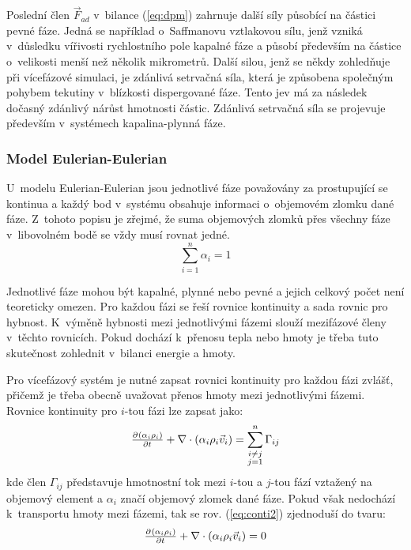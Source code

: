 Poslední člen $\vec{F}_{ad}$ v~bilance (\ref{eq:dpm}) zahrnuje další síly působící na částici pevné fáze. Jedná se například o~Saffmanovu vztlakovou sílu, jenž vzniká v~důsledku vířivosti rychlostního pole kapalné fáze a působí především na částice o~velikosti menší než několik mikrometrů. Další silou, jenž se někdy zohledňuje při vícefázové simulaci, je zdánlivá setrvačná síla, která je způsobena společným pohybem tekutiny v~blízkosti dispergované fáze. Tento jev má za následek dočasný zdánlivý nárůst hmotnosti částic. Zdánlivá setrvačná síla se projevuje především v~systémech kapalina-plynná fáze.  

\subsubsection{Model Eulerian-Eulerian}
U~modelu Eulerian-Eulerian jsou jednotlivé fáze považovány za prostupující se kontinua a každý bod v~systému obsahuje informaci o~objemovém zlomku dané fáze. Z~tohoto popisu je zřejmé, že suma objemových zlomků přes všechny fáze v~libovolném bodě se vždy musí rovnat jedné. 
\begin{equation}
	\sum_{i=1}^n \alpha_{i} = 1
	\label{eq:volfrac}
\end{equation} 

Jednotlivé fáze mohou být kapalné, plynné nebo pevné a jejich celkový počet není teoreticky omezen. Pro každou fázi se řeší rovnice kontinuity a sada rovnic pro hybnost. K~výměně hybnosti mezi jednotlivými fázemi slouží mezifázové členy v~těchto rovnicích. Pokud dochází k~přenosu tepla nebo hmoty je třeba tuto skutečnost zohlednit v~bilanci energie a hmoty.    

Pro vícefázový systém je nutné zapsat rovnici kontinuity pro každou fázi zvlášť, přičemž je třeba obecně uvažovat přenos hmoty mezi jednotlivými fázemi. Rovnice kontinuity pro $i$-tou fázi lze zapsat jako:
\begin{equation}
	\pd{\kula{\alpha_{i}\rho_{i}}}{t} +  \nabla \cdot (\alpha_{i}\rho_{i}\vec{v}_{i}) = \sum_{\substack{ i \neq j \\ j=1}}^{n}\Gamma_{ij}
	\label{eq:conti2}
\end{equation} 
kde člen $\Gamma_{ij}$ představuje hmotnostní tok mezi $i$-tou a $j$-tou fází vztažený na objemový element a $\alpha_{i}$ značí objemový zlomek dané fáze. Pokud však nedochází k~transportu hmoty mezi fázemi, tak se rov. (\ref{eq:conti2}) zjednoduší do tvaru:
\begin{equation}
	\pd{\kula{\alpha_{i}\rho_{i}}}{t} +  \nabla \cdot (\alpha_{i}\rho_{i}\vec{v}_{i}) = 0
	\label{eq:conti3}
\end{equation} 

